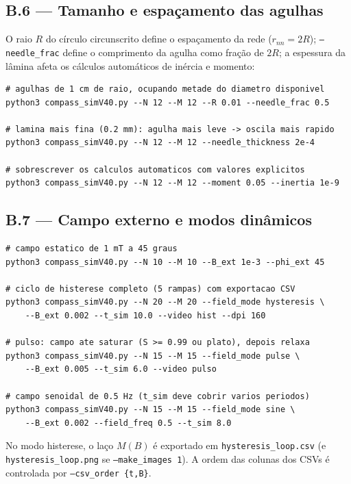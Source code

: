 \documentclass[11pt,a4paper]{article}
\newcommand{\code}[1]{\texttt{#1}}
\begin{document}
\subsection*{B.6 --- Tamanho e espaçamento das agulhas}

O raio $R$ do círculo circunscrito define o espaçamento da rede
($r_{nn} = 2R$); \code{--needle\_frac} define o comprimento da agulha
como fração de $2R$; a espessura da lâmina afeta os cálculos
automáticos de inércia e momento:
\begin{verbatim}
# agulhas de 1 cm de raio, ocupando metade do diametro disponivel
python3 compass_simV40.py --N 12 --M 12 --R 0.01 --needle_frac 0.5

# lamina mais fina (0.2 mm): agulha mais leve -> oscila mais rapido
python3 compass_simV40.py --N 12 --M 12 --needle_thickness 2e-4

# sobrescrever os calculos automaticos com valores explicitos
python3 compass_simV40.py --N 12 --M 12 --moment 0.05 --inertia 1e-9
\end{verbatim}

\subsection*{B.7 --- Campo externo e modos dinâmicos}

\begin{verbatim}
# campo estatico de 1 mT a 45 graus
python3 compass_simV40.py --N 10 --M 10 --B_ext 1e-3 --phi_ext 45

# ciclo de histerese completo (5 rampas) com exportacao CSV
python3 compass_simV40.py --N 20 --M 20 --field_mode hysteresis \
    --B_ext 0.002 --t_sim 10.0 --video hist --dpi 160

# pulso: campo ate saturar (S >= 0.99 ou plato), depois relaxa
python3 compass_simV40.py --N 15 --M 15 --field_mode pulse \
    --B_ext 0.005 --t_sim 6.0 --video pulso

# campo senoidal de 0.5 Hz (t_sim deve cobrir varios periodos)
python3 compass_simV40.py --N 15 --M 15 --field_mode sine \
    --B_ext 0.002 --field_freq 0.5 --t_sim 8.0
\end{verbatim}
No modo histerese, o laço $M(B)$ é exportado em
\code{hysteresis\_loop.csv} (e \code{hysteresis\_loop.png} se
\code{--make\_images 1}). A ordem das colunas dos CSVs é controlada por
\code{--csv\_order \{t,B\}}.
\end{document}
